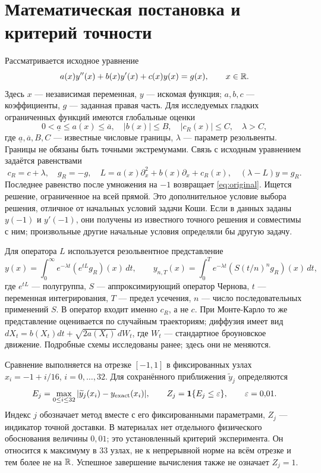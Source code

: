 \section{Математическая постановка и критерий точности}
Рассматривается исходное уравнение
\begin{equation}\label{eq:original}
a(x)y''(x)+b(x)y'(x)+c(x)y(x)=g(x),\qquad x\in\mathbb R.
\end{equation}
Здесь $x$ --- независимая переменная, $y$ --- искомая функция; $a,b,c$ --- коэффициенты, $g$ --- заданная правая часть. Для исследуемых гладких ограниченных функций имеются глобальные оценки
\begin{equation}\label{eq:conditions}
0<\underline a\le a(x)\le\overline a,\quad |b(x)|\le B,
\quad |c_R(x)|\le C,\quad \lambda>C,
\end{equation}
где $\underline a,\overline a,B,C$ --- известные числовые границы, $\lambda$ --- параметр резольвенты. Границы не обязаны быть точными экстремумами. Связь с исходным уравнением задаётся равенствами
\begin{equation}\label{eq:operator}
c_R=c+\lambda,\quad g_R=-g,\quad
L=a(x)\partial_x^2+b(x)\partial_x+c_R(x),\quad (\lambda-L)y=g_R.
\end{equation}
Последнее равенство после умножения на $-1$ возвращает \eqref{eq:original}. Ищется решение, ограниченное на всей прямой. Это дополнительное условие выбора решения, отличное от начальных условий задачи Коши. Если в данных заданы $y(-1)$ и $y'(-1)$, они получены из известного точного решения и совместимы с ним; произвольные другие начальные условия определяли бы другую задачу.

\clearpage
{}
Для оператора $L$ используется резольвентное представление
\begin{equation}\label{eq:resolvent}
y(x)=\int_0^\infty e^{-\lambda t}(e^{tL}g_R)(x)\,dt,
\qquad y_{n,T}(x)=\int_0^T e^{-\lambda t}(S(t/n)^ng_R)(x)\,dt,
\end{equation}
где $e^{tL}$ --- полугруппа, $S$ --- аппроксимирующий оператор Чернова, $t$ --- переменная интегрирования, $T$ --- предел усечения, $n$ --- число последовательных применений $S$. В оператор входит именно $c_R$, а не $c$. При Монте-Карло то же представление оценивается по случайным траекториям; диффузия имеет вид $dX_t=b(X_t)dt+\sqrt{2a(X_t)}\,dW_t$, где $W_t$ --- стандартное броуновское движение. Подробные схемы исследованы ранее; здесь они не меняются.

Сравнение выполняется на отрезке $[-1,1]$ в фиксированных узлах $x_i=-1+i/16$, $i=0,\ldots,32$. Для сохранённого приближения $\widetilde y_j$ определяются
\begin{equation}\label{eq:error}
E_j=\max_{0\le i\le32}|\widetilde y_j(x_i)-y_{\mathrm{exact}}(x_i)|,
\qquad Z_j=\mathbf 1\{E_j\le\varepsilon\},\qquad \varepsilon=0{,}01.
\end{equation}
Индекс $j$ обозначает метод вместе с его фиксированными параметрами, $Z_j$ --- индикатор точной доставки. В материалах нет отдельного физического обоснования величины $0{,}01$; это установленный критерий эксперимента. Он относится к максимуму в 33 узлах, не к непрерывной норме на всём отрезке и тем более не на $\mathbb R$. Успешное завершение вычисления также не означает $Z_j=1$.

